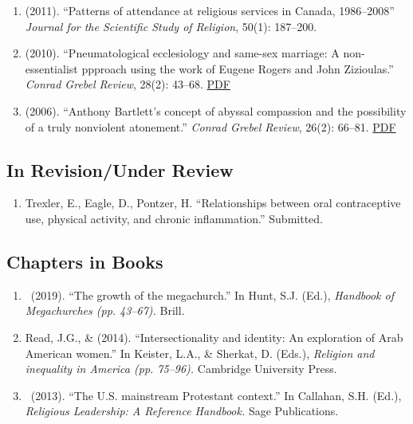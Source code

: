 \begin{enumerate}
\item \Eagle \hspace{.01em} (2011). ``Patterns of attendance at religious services in Canada, 1986--2008'' \emph{Journal for the Scientific Study of Religion}, 50(1): 187--200. 

\item \Eagle \hspace{.01em} (2010). ``Pneumatological ecclesiology and same-sex marriage: A non-essentialist ppproach using the work of Eugene Rogers and John Zizioulas.'' \emph{Conrad Grebel Review}, 28(2): 43--68. \href{https://www.davideagle.org/publication/eagle-pneumatological-ecclesiology-samesex-2010/eagle-pneumatological-ecclesiology-samesex-2010.pdf}{PDF}

\item \Eagle\hspace{.01em} (2006). ``Anthony Bartlett's concept of abyssal compassion and the possibility of a truly nonviolent atonement.'' \emph{Conrad Grebel Review}, 26(2): 66--81. \href{https://www.davideagle.org/publication/eagle-anthony-bartlett-concept-2006/eagle-anthony-bartlett-concept-2006.pdf}{PDF}

\end{enumerate}

\subsection*{In Revision/Under Review}
\begin{enumerate}
\item Trexler, E., Eagle, D., Pontzer, H. ``Relationships between oral contraceptive use, physical activity, and chronic inflammation.'' Submitted.

\end{enumerate}

\subsection*{Chapters in Books}
\begin{enumerate} 
\item \Eagle\ (2019). ``The growth of the megachurch.'' In Hunt, S.J. (Ed.), \emph{Handbook of Megachurches (pp. 43--67).} Brill.

\item Read, J.G., \& \Eagle \hspace{.01em}  (2014). ``Intersectionality and identity: An exploration of Arab American women.'' In Keister, L.A., \& Sherkat, D. (Eds.), \emph{Religion and inequality in America (pp. 75--96).} Cambridge University Press.

\item \Eagle\ (2013). ``The U.S. mainstream Protestant context.'' In Callahan, S.H. (Ed.), \emph{Religious Leadership: A Reference Handbook.} Sage Publications.
\end{enumerate}

